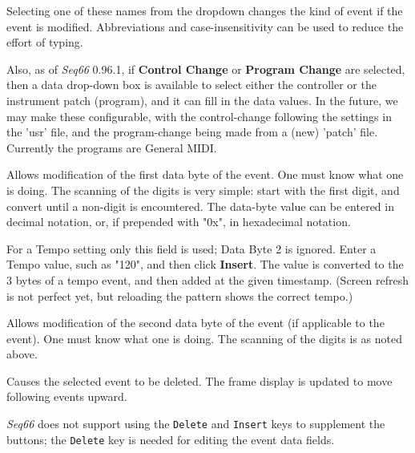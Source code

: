 
   Selecting one of these names from the dropdown changes the kind of event if
   the event is modified.  Abbreviations and case-insensitivity can be used to
   reduce the effort of typing.

   Also, as of \textsl{Seq66} 0.96.1, if \textbf{Control Change} or
   \textbf{Program Change} are selected, then a data drop-down box is available
   to select either the controller or
   the instrument patch (program), and it can fill in the data values.
   In the future, we may make these configurable, with the control-change
   following the settings in the 'usr' file, and the program-change being made
   from a (new) 'patch' file. Currently the programs are General MIDI.

   Allows modification of the first data byte of the event.
   One must know what one is doing.
   The scanning of the digits is very simple:  start with the first digit, and
   convert until a non-digit is encountered.  The data-byte value can be
   entered in decimal notation, or, if prepended with "0x", in hexadecimal
   notation.

   For a Tempo setting only this field is used; Data Byte 2 is ignored.
   Enter a Tempo value, such as "120", and then click \textbf{Insert}. The
   value is converted to the 3 bytes of a tempo event, and then
   added at the given timestamp.  (Screen refresh is not perfect yet, but
   reloading the pattern shows the correct tempo.)

   Allows modification of the second data byte of the event (if applicable
   to the event).
   One must know what one is doing.
   The scanning of the digits is as noted above.

   Causes the selected event to be deleted.
   The frame display is updated to move following events upward.

   \textsl{Seq66} does not support using the
   \texttt{Delete} and \texttt{Insert} keys to
   supplement the buttons; the \texttt{Delete}
   key is needed for editing the event data fields.


